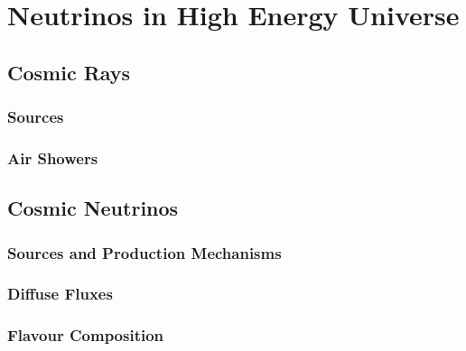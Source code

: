 \setchapterpreamble[u]{\margintoc}
\chapter{Neutrinos in High Energy Universe}




\section{Cosmic Rays}

\label{sec:cosmic_rays}

\subsection{Sources}

\subsection{Air Showers}


\section{Cosmic Neutrinos}
\label{sec:cosmic_nu}

\subsection{Sources and Production Mechanisms}

\subsection{Diffuse Fluxes}

\subsection{Flavour Composition}